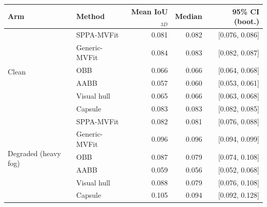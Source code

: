 \begin{tabular}{llrrr}
\toprule
Arm & Method & Mean IoU$_{3D}$ & Median & 95\% CI (boot.) \\
\midrule
\multirow{6}{*}{Clean} & SPPA-MVFit & 0.081 & 0.082 & [0.076, 0.086] \\
 & Generic-MVFit & 0.084 & 0.083 & [0.082, 0.087] \\
 & OBB & 0.066 & 0.066 & [0.064, 0.068] \\
 & AABB & 0.057 & 0.060 & [0.053, 0.061] \\
 & Visual hull & 0.065 & 0.066 & [0.063, 0.068] \\
 & Capsule & 0.083 & 0.083 & [0.082, 0.085] \\
\midrule
\multirow{6}{*}{Degraded (heavy fog)} \footnotesize(4 det. fail) & SPPA-MVFit & 0.082 & 0.081 & [0.076, 0.088] \\
 & Generic-MVFit & 0.096 & 0.096 & [0.094, 0.099] \\
 & OBB & 0.087 & 0.079 & [0.074, 0.108] \\
 & AABB & 0.059 & 0.056 & [0.052, 0.068] \\
 & Visual hull & 0.088 & 0.079 & [0.076, 0.108] \\
 & Capsule & 0.105 & 0.094 & [0.092, 0.128] \\
\bottomrule
\end{tabular}
